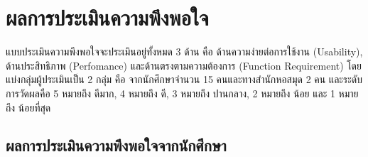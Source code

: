 \section{ผลการประเมินความพึงพอใจ}
แบบประเมินความพึงพอใจจะประเมินอยู่ทั้งหมด 3 ด้าน คือ ด้านความง่ายต่อการใช้งาน (Usability), ด้านประสิทธิภาพ (Perfomance) และด้านตรงตามความต้องการ (Function Requirement) โดยแบ่งกลุ่มผู้ประเมินเป็น 2 กลุ่ม คือ จากนักศึกษาจำนวน 15 คนและทางสำนักหอสมุด 2 คน 
และระดับการวัดผลคือ 5 หมายถึง ดีมาก, 4 หมายถึง ดี, 3 หมายถึง ปานกลาง, 2 หมายถึง น้อย และ 1 หมายถึง น้อยที่สุด

\newpage
\subsection{ผลการประเมินความพึงพอใจจากนักศึกษา}

    

